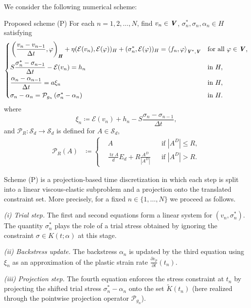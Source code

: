 \documentclass[11pt, a4paper]{article}
\newcommand{\Sym}{{\mathcal S}}
\newcommand{\tr}{\operatorname{tr}}
\newcommand{\defeq}{\coloneqq}
\newcommand{\prz}[2]{ \frac{\partial{#1}}{\partial{#2}} }
\newcommand{\dt}{{\Delta t}}
\newcommand{\E}{{\mathcal{E}}}
\newcommand{\bm}[1]{\textbf{\textit{#1}}}%
\newcommand{\Hv}{{\bm{H}}}
\newcommand{\Vv}{{\bm{V}}}
\newcommand{\Hs}{{H}}
\newcommand{\blaket}[2]{ \left\langle {#1},{#2}\right\rangle_{\Vv^*,\Vv} }
\newcommand{\inner}[3]{ \left( {#1},{#2}\right)_{#3} }
\newcommand{\Pop}[1]{\mathcal{P}_{#1}}
\newcommand{\sigmas}[1]{{\sigma_{#1}^*}}
\newcommand{\eps}{\varepsilon}
\begin{document}
We consider the following numerical scheme: 
\begin{itembox}[l]{Proposed scheme (P)} 
For each $n=1,2,\ldots,N$, find $v_n\in\Vv$, $\sigmas{n},\sigma_n,\alpha_n\in\Hs$ satisfying
\begin{align*}\left\{\begin{aligned}
    &\inner{\frac{v_n-v_{n-1}}{\dt}}{\varphi}{\Hv}
    + \eta (\E(v_n),\E(\varphi))_\Hs + (\sigmas{n},\E(\varphi))_\Hs
    = \blaket{f_n}{\varphi} && \mbox{for all }\varphi\in\Vv,\\
    &S\frac{\sigmas{n}-\sigma_{n-1}}{\dt} - \E(v_n) = h_n
    &&\mbox{in }\Hs,\\
    & \frac{\alpha_n - \alpha_{n-1}}{\dt}
    = a\xi_n &&\mbox{in }\Hs,\\
    &\sigma_n - \alpha_n
    = \Pop{g_n}\left(\sigmas{n} - \alpha_n \right)
    &&\mbox{in }\Hs.\\
\end{aligned}\right.\end{align*}
where 
\[
    \xi_n \defeq \E(v_n) + h_n - S\frac{\sigma_n - \sigma_{n-1}}{\dt},
\]
and $\Pop{R}:\Sym_d\rightarrow\Sym_d$ is defined for $A\in\Sym_d$, 
\begin{align*}
    \Pop{R}(A) &\defeq \left\{\begin{aligned}
        &A
        &&\mbox{if }|A^D|\le R,\\
        &\frac{\tr A}{d}E_d + R\frac{A^D}{|A^D|}
        &&\mbox{if }|A^D|>R.
    \end{aligned}\right.
\end{align*}
\end{itembox}

Scheme (P) is a projection-based time discretization in which each step is split into a linear viscous-elastic subproblem and a projection onto the translated constraint set. More precisely, for a fixed $n\in\{1,\dots,N\}$ we proceed as follows.

\smallskip
\noindent\emph{(i) Trial step.}
The first and second equations form a linear system for $(v_n,\sigmas{n})$.
The quantity $\sigmas{n}$ plays the role of a trial stress obtained by ignoring the constraint $\sigma\in K(t;\alpha)$ at this stage.

\smallskip
\noindent\emph{(ii) Backstress update.}
The backstress $\alpha_n$ is updated by the third equation using $\xi_n$ as an approximation of the plastic strain rate $\prz{\eps_p}{t}(t_n)$.

\smallskip
\noindent\emph{(iii) Projection step.}
The fourth equation enforces the stress constraint at $t_n$ by projecting the shifted trial stress $\sigmas{n}-\alpha_n$ onto the set $\tilde K(t_n)$ (here realized through the pointwise projection operator $\Pop{g_n}$).
\end{document}
